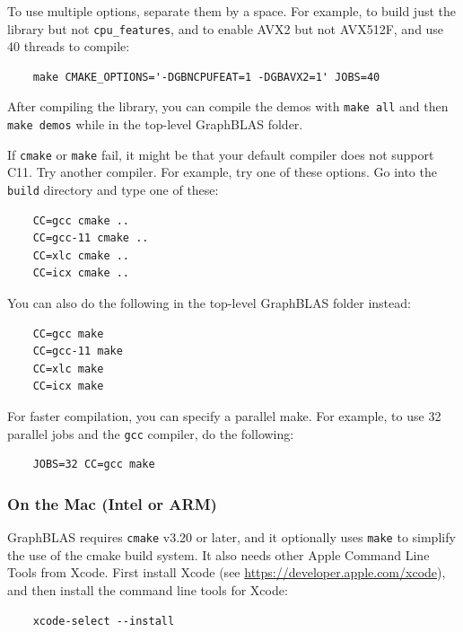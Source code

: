 To use multiple options, separate them by a space.  For example, to build
just the library but not \verb'cpu_features', and to enable
AVX2 but not AVX512F, and use 40 threads to compile:

    {\small
    \begin{verbatim}
    make CMAKE_OPTIONS='-DGBNCPUFEAT=1 -DGBAVX2=1' JOBS=40 \end{verbatim} }

After compiling the library, you can compile the demos with
\verb'make all' and then \verb'make demos' while in the top-level
GraphBLAS folder.

If \verb'cmake' or \verb'make' fail, it might be that your default compiler
does not support C11.  Try another compiler.  For example, try one of
these options.  Go into the \verb'build' directory and type one of these:

    {\small
    \begin{verbatim}
    CC=gcc cmake ..
    CC=gcc-11 cmake ..
    CC=xlc cmake ..
    CC=icx cmake ..  \end{verbatim} }

You can also do the following in the top-level GraphBLAS folder instead:

    {\small
    \begin{verbatim}
    CC=gcc make
    CC=gcc-11 make
    CC=xlc make
    CC=icx make \end{verbatim} }

For faster compilation, you can specify a parallel make.  For example,
to use 32 parallel jobs and the \verb'gcc' compiler, do the following:

    {\small
    \begin{verbatim}
    JOBS=32 CC=gcc make \end{verbatim} }

\subsubsection{On the Mac (Intel or ARM)}

GraphBLAS requires \verb'cmake' v3.20 or later, and it optionally uses
\verb'make' to simplify the use of the cmake build system.  It also needs
other Apple Command Line Tools from Xcode.
First install Xcode (see \url{https://developer.apple.com/xcode}),
and then install the command line tools for Xcode:

    {\small
    \begin{verbatim}
    xcode-select --install \end{verbatim} }

